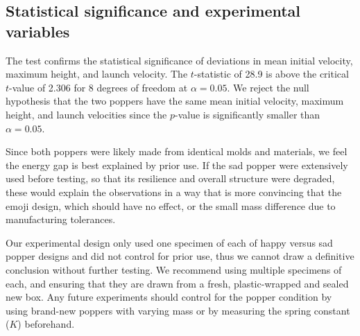 \documentclass[reprint,amsmath,amssymb,aps,twoside]{revtex4-2} %
\begin{document}
\subsection{Statistical significance and experimental variables}
The test confirms the statistical significance of deviations in mean initial velocity, maximum height, and launch velocity. The $t$-statistic of 28.9 is above the critical $t$-value of 2.306 for 8 degrees of freedom at $\alpha = 0.05$. We reject the null hypothesis that the two poppers have the same mean initial velocity, maximum height, and launch velocities since the $p$-value is significantly smaller than $\alpha=0.05$. 

Since both poppers were likely made from identical molds and materials, we feel the energy gap is best explained by prior use. If the sad popper were extensively used before testing, so that its resilience and overall structure were degraded, these would explain the observations in a way that is more convincing that the emoji design, which should have no effect, or the small mass difference due to manufacturing tolerances.



Our experimental design only used one specimen of each of happy versus sad popper designs and did not control for prior use, thus we cannot draw a definitive conclusion without further testing. We recommend using multiple specimens of each, and ensuring that they are drawn from a fresh, plastic-wrapped and sealed new box.  Any future experiments should control for the popper condition by using brand-new poppers with varying mass or by measuring the spring constant ($K$) beforehand.
    
\end{document}
